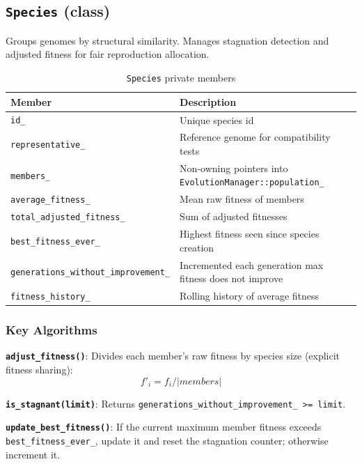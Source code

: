 \subsection{\texttt{Species} (class)}

Groups genomes by structural similarity.  Manages stagnation detection and adjusted
fitness for fair reproduction allocation.

\begin{table}[H]
\centering\small
\caption{\texttt{Species} private members}
\begin{tabularx}{\textwidth}{@{}lX@{}}
\toprule
\textbf{Member} & \textbf{Description} \\
\midrule
\texttt{id\_}                           & Unique species id \\
\texttt{representative\_}               & Reference genome for compatibility tests \\
\texttt{members\_}                      & Non-owning pointers into \texttt{EvolutionManager::population\_} \\
\texttt{average\_fitness\_}             & Mean raw fitness of members \\
\texttt{total\_adjusted\_fitness\_}     & Sum of adjusted fitnesses \\
\texttt{best\_fitness\_ever\_}          & Highest fitness seen since species creation \\
\texttt{generations\_without\_improvement\_} & Incremented each generation max fitness does not improve \\
\texttt{fitness\_history\_}             & Rolling history of average fitness \\
\bottomrule
\end{tabularx}
\end{table}

\subsubsection{Key Algorithms}

\textbf{\texttt{adjust\_fitness()}}: Divides each member's raw fitness by species size
(explicit fitness sharing):
\[
  f'_i = f_i / |\mathit{members}|
\]

\textbf{\texttt{is\_stagnant(limit)}}: Returns
\texttt{generations\_without\_improvement\_ >= limit}.

\textbf{\texttt{update\_best\_fitness()}}: If the current maximum member fitness exceeds
\texttt{best\_fitness\_ever\_}, update it and reset the stagnation counter; otherwise
increment it.

